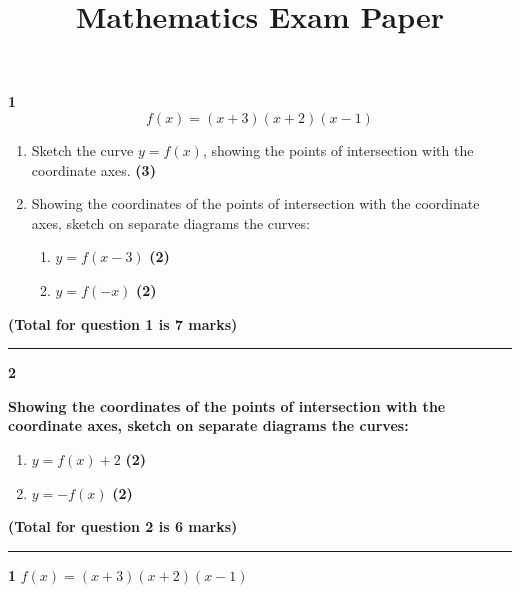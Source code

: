 \documentclass[a4paper,12pt]{article}
\begin{document}
 
\title{\textbf{Mathematics Exam Paper}} %
\date{} %
\maketitle %

\begin{tcolorbox}
[width=\textwidth, height=\textheight, colframe=black, colback=white, arc=5mm, boxrule=0.2mm]

\textbf{1} \hspace{1em} 
\[f(x) = (x + 3)(x + 2)(x - 1)\] 

\begin{enumerate}[label=(\alph*)]
\item Sketch the curve \( y = f(x) \), showing the points of intersection with the coordinate axes. \hfill \textbf{(3)}
\item Showing the coordinates of the points of intersection with the coordinate axes, sketch on separate diagrams the curves:
    \begin{enumerate}[label=(\roman*)]
    \item \( y = f(x - 3) \) \hfill \textbf{(2)}
    \item \( y = f(-x) \) \hfill \textbf{(2)}
    \end{enumerate}
\end{enumerate}

\hfill \textbf{(Total for question 1 is 7 marks)}

\hrule height 0.4pt
\vspace{1em}

\textbf{2} \hspace{1em}

\textbf{Showing the coordinates of the points of intersection with the coordinate axes, sketch on separate diagrams the curves:}
\begin{enumerate}[label=(\alph*)]
\vfill
\item \( y = f(x) + 2 \) \hfill \textbf{(2)}
\item \( y = -f(x) \) \hfill \textbf{(2)}
\vfill
\end{enumerate}

\hfill \textbf{(Total for question 2 is 6 marks)}

\hrule height 0.4pt
\vspace{1em}

\textbf{1} \hspace{1em} %
\textbf{$f(x) = (x + 3)(x + 2)(x - 1)$} 


\end{tcolorbox}
\end{document}
